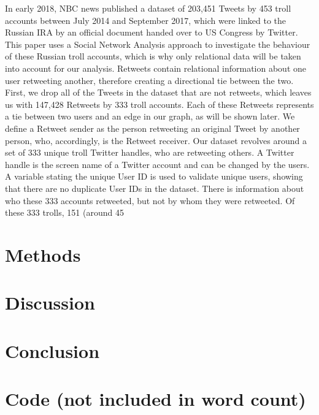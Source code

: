 \documentclass[12pt, titlepage=true, toc=bib]{scrartcl}
\begin{document}
In early 2018, NBC news published a dataset of 203,451 Tweets by 453 troll accounts between July 2014 and September 2017, which were linked to the Russian IRA by an official document handed over to US Congress by Twitter. This paper uses a Social Network Analysis approach to investigate the behaviour of these Russian troll accounts, which is why only relational data will be taken into account for our analysis. 
Retweets contain relational information about one user retweeting another, therefore creating a directional tie between the two. First, we drop all of the Tweets in the dataset that are not retweets, which leaves us with 147,428 Retweets by 333 troll accounts. Each of these Retweets represents a tie between two users and an edge in our graph, as will be shown later. We define a Retweet sender as the person retweeting an original Tweet by another person, who, accordingly, is the Retweet receiver. 
Our dataset revolves around a set of 333 unique troll Twitter handles, who are retweeting others. A Twitter handle is the screen name of a Twitter account and can be changed by the users. A variable stating the unique User ID is used to validate unique users, showing that there are no duplicate User IDs in the dataset. There is information about who these 333 accounts retweeted, but not by whom they were retweeted. Of these 333 trolls, 151 (around 45%

\section{Methods}

\section{Discussion}

\section{Conclusion}

\section{Code (not included in word count)}



\newpage

\printbibliography
\end{document}
